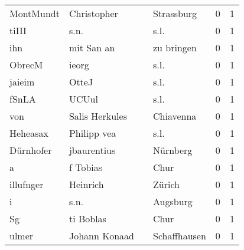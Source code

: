\begin{center}
\begin{tiny}
\begin{longtabu}{llllrr}
                MontMundt &                        Christopher &             &                                  Strassburg &          0 &         1 \\
                    tiIII &                               s.n. &             &                                        s.l. &          0 &         1 \\
                      ihn &                         mit San an &             &                                  zu bringen &          0 &         1 \\
                   ObrecM &                              ieorg &             &                                        s.l. &          0 &         1 \\
                   jaieim &                              OtteJ &             &                                        s.l. &          0 &         1 \\
                    fSnLA &                              UCUul &             &                                        s.l. &          0 &         1 \\
                      von &                     Salis Herkules &             &                                   Chiavenna &          0 &         1 \\
                 Heheasax &                        Philipp vea &             &                                        s.l. &          0 &         1 \\
                Dürnhofer &                        jbaurentius &             &                                    Nürnberg &          0 &         1 \\
                        a &                           f Tobias &             &                                        Chur &          0 &         1 \\
                illufnger &                           Heinrich &             &                                      Zürich &          0 &         1 \\
                        i &                               s.n. &             &                                    Augsburg &          0 &         1 \\
                       Sg &                          ti Boblas &             &                                        Chur &          0 &         1 \\
                    ulmer &                      Johann Konaad &             &                                Schaffhausen &          0 &         1 \\

\end{longtabu}
\end{tiny}
\end{center}
